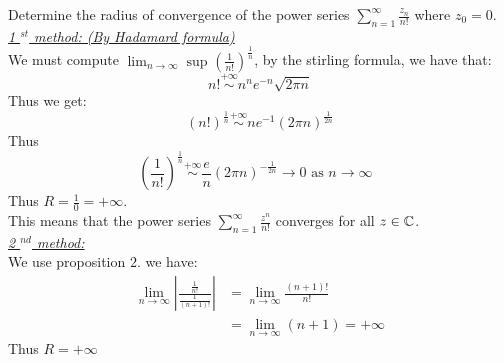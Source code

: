 \begin{example}
Determine the radius of convergence of the power series $\sum_{n=1}^{\infty} \frac{z _n }{n!}$ where $z_0 = 0$.  \\
\underline{\emph{1 $^{st} $ method: (By Hadamard formula) }}  \\
We must compute $\lim_{n \to \infty} \sup_{} \left( \frac{1}{n!} \right)^{\frac{1}{n}} $, 
by the stirling formula, we have that: 
\[
n! \overset{+\infty }{\sim} n^{n}e^{-n} \sqrt{2\pi n} 
\]
Thus we get: 
\[
(n!) ^{\frac{1}{n}} \overset{+\infty }{\sim} n e^{-1}(2 \pi n) ^{\frac{1}{2n}}
\]
Thus \[
\left( \frac{1}{n!} \right)^{\frac{1}{n}} 
\overset{+\infty }{\sim} 
\frac{e}{n}(2 \pi  n) ^{-\frac{1}{2n}} \rightarrow 0 \text{ as $n \rightarrow \infty  $ } 
\]
Thus $R = \frac{1}{0} = +\infty$. \\
This means that the power series $\sum_{n=1}^{\infty} \frac{z^{n}}{n!} $ converges
for all $z \in \mathbb{C} $. \\
\underline{\emph{2 $^{nd} $ method:}}  \\
We use proposition $2 $. we have: 
\begin{align*}
\lim_{n \to \infty} \left| \frac{\frac{1}{n!}}{\frac{1}{(n+1) !}} \right|  
&= 
\lim_{n \to \infty} \frac{(n+1) !}{n!} \\
&= \lim_{n \to \infty} (n+1)  = +\infty 
\end{align*}
Thus $R = +\infty $ 
\end{example}
